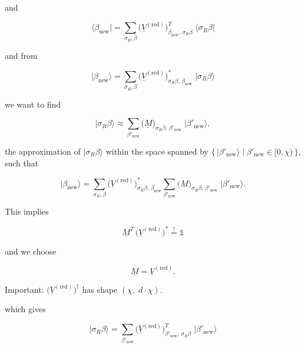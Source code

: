 and

\begin{equation}
\boxed{\;\big\langle\beta_{\mathrm{new}}\big| = \sum_{\sigma_R,\beta}\big(\underline{V}^{(\mathrm{red})}\big)^{T}_{\beta_{\mathrm{new}},\,\sigma_R\beta}\;\big\langle\sigma_R\beta\big|\;}
\end{equation}

and from

\begin{equation}
\big|\beta_{\mathrm{new}}\big\rangle = \sum_{\sigma_R,\beta}\big(\underline{V}^{(\mathrm{red})}\big)^{*}_{\sigma_R\beta,\,\beta_{\mathrm{new}}}\;\big|\sigma_R\beta\big\rangle
\end{equation}

we want to find

\begin{equation}
\big|\sigma_R\beta\big\rangle \approx \sum_{\beta'_{\mathrm{new}}}\big(\underline{M}\big)_{\sigma_R\beta,\,\beta'_{\mathrm{new}}}\;\big|\beta'_{\mathrm{new}}\big\rangle,
\end{equation}

the approximation of $|\sigma_R\beta\rangle$ within the space spanned by
$\big\{\,|\beta'_{\mathrm{new}}\rangle \;\big|\; \beta'_{\mathrm{new}}\in[0,\chi)\,\big\}$, such that

\begin{equation}
\big|\beta_{\mathrm{new}}\big\rangle = \sum_{\sigma_R,\beta}\big(\underline{V}^{(\mathrm{red})}\big)^{*}_{\sigma_R\beta,\,\beta_{\mathrm{new}}}
\sum_{\beta'_{\mathrm{new}}}\big(\underline{M}\big)_{\sigma_R\beta,\,\beta'_{\mathrm{new}}}\;\big|\beta'_{\mathrm{new}}\big\rangle.
\end{equation}

This implies

\begin{equation}
\underline{M}^{T}\,\big(\underline{V}^{(\mathrm{red})}\big)^{*} \overset{!}{=} \mathbb{1}
\end{equation}

and we choose

\begin{equation}
\underline{M} = \underline{V}^{(\mathrm{red})}.
\end{equation}

Important: $\big(\underline{V}^{(\mathrm{red})}\big)^{\dagger}$ has shape $(\chi,\;d\cdot\chi)$.

which gives

\begin{equation}
\boxed{\;\big|\sigma_R\beta\big\rangle = \sum_{\beta'_{\mathrm{new}}}\big(\underline{V}^{(\mathrm{red})}\big)^{T}_{\beta'_{\mathrm{new}},\,\sigma_R\beta}\;\big|\beta'_{\mathrm{new}}\big\rangle\;}
\end{equation}

